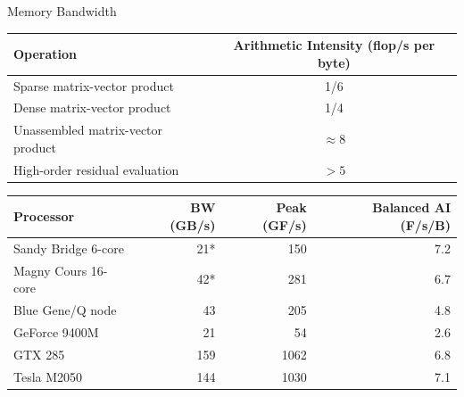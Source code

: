 \documentclass{beamer}
\begin{document}
\begin{frame}{Memory Bandwidth}
  \begin{tabular}{lc}
    \toprule
    Operation                         & Arithmetic Intensity (flop/s per byte) \\
    \midrule
    Sparse matrix-vector product      & 1/6                  \\
    Dense matrix-vector product       & 1/4                  \\
    Unassembled matrix-vector product & $\approx 8$          \\
    High-order residual evaluation    & $> 5$                \\
    \bottomrule
  \end{tabular}
  \bigskip
  \begin{tabular}{lrrr}
    \toprule
    Processor           & BW (GB/s) & Peak (GF/s) & Balanced AI (F/s/B) \\
    \midrule
    Sandy Bridge 6-core & 21*       & 150         & 7.2                 \\
    Magny Cours 16-core & 42*       & 281         & 6.7                 \\
    Blue Gene/Q node    & 43        & 205         & 4.8                 \\
    GeForce 9400M       & 21        & 54          & 2.6                 \\
    GTX 285             & 159       & 1062        & 6.8                 \\
    Tesla M2050         & 144       & 1030        & 7.1                 \\
    \bottomrule
  \end{tabular}
\end{frame}
\end{document}
